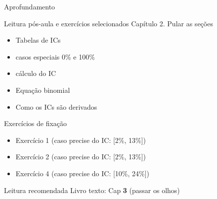 \documentclass{beamer}
\begin{document}
\begin{frame}{Aprofundamento}
  \begin{block}{Leitura pós-aula e exercícios selecionados}
    \footnotesize
    Capítulo 2. Pular as seções
    \begin{itemize}
      \scriptsize
    \item Tabelas de ICs
    \item casos especiais 0\% e 100\%
    \item cálculo do IC
    \item Equação binomial
    \item Como os ICs são derivados
    \end{itemize}
  \end{block}

  \begin{block}{Exercícios de fixação}
    \begin{itemize}
      \scriptsize
    \item Exercício 1 (caso precise do IC: [2\%, 13\%])
    \item Exercício 2 (caso precise do IC: [2\%, 13\%])
    \item Exercício 4 (caso precise do IC: [10\%, 24\%])
    \end{itemize}
  \end{block}

  \begin{block}{Leitura recomendada}
    \scriptsize
    Livro texto: Cap {\bf 3} (passar os olhos)
  \end{block}
\end{frame}
\end{document}
